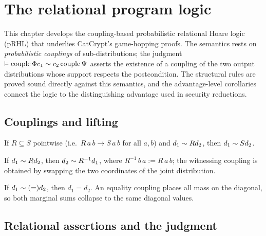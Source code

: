 \chapter{The relational program logic}

This chapter develops the coupling-based probabilistic relational Hoare logic
(pRHL) that underlies CatCrypt's game-hopping proofs. The semantics rests on
\emph{probabilistic couplings} of sub-distributions; the judgment
$\vDash \operatorname{couple}{\Phi} c_1 \sim c_2 \operatorname{couple}{\Psi}$ asserts the existence of a
coupling of the two output distributions whose support respects the
postcondition. The structural rules are proved sound directly against this
semantics, and the advantage-level corollaries connect the logic to the
distinguishing advantage used in security reductions.

\section{Couplings and lifting}

\begin{lemma}
  \label{lem:liftr-mono}
  \leanok
  If $R \subseteq S$ pointwise (i.e.\ $R\,a\,b \to S\,a\,b$ for all $a,b$) and
  $d_1 \mathrel{\sim}{R} d_2$, then $d_1 \mathrel{\sim}{S} d_2$.
\end{lemma}

\begin{lemma}
  \label{lem:liftr-symm}
  \leanok
  If $d_1 \mathrel{\sim}{R} d_2$, then $d_2 \mathrel{\sim}{R^{-1}} d_1$, where
  $R^{-1}\,b\,a := R\,a\,b$; the witnessing coupling is obtained by swapping the
  two coordinates of the joint distribution.
\end{lemma}

\begin{lemma}
  \label{lem:liftr-eq-implies-eq}
  \leanok
  If $d_1 \mathrel{\sim}{(=)} d_2$, then $d_1 = d_2$. An equality coupling places all
  mass on the diagonal, so both marginal sums collapse to the same diagonal
  values.
\end{lemma}

\section{Relational assertions and the judgment}

